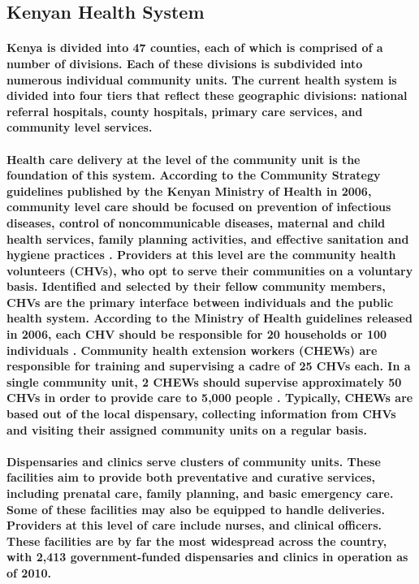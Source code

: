 \subsection{Kenyan Health System}
\paragraph{Kenya is divided into 47 counties, each of which is comprised of a number of divisions. Each of these divisions is subdivided into numerous individual community units. The current health system is divided into four tiers that reflect these geographic divisions: national referral hospitals, county hospitals, primary care services, and community level services. \citep{SPA2010}}

\paragraph{Health care delivery at the level of the community unit is the foundation of this system. According to the Community Strategy guidelines published by the Kenyan Ministry of Health in 2006, community level care should be focused on prevention of infectious diseases, control of noncommunicable diseases, maternal and child health services, family planning activities, and effective sanitation and hygiene practices \citep{CommunityStrategy2006}. Providers at this level are the community  health volunteers (CHVs), who opt to serve their communities on a voluntary basis. Identified and selected by their fellow community members, CHVs are the primary interface between individuals and the public health system. According to the Ministry of Health guidelines released in 2006, each CHV should be responsible for 20 households or 100 individuals \citep{CommunityStrategy2006}. Community health extension workers (CHEWs) are responsible for training and supervising a cadre of 25 CHVs each. In a single community unit, 2 CHEWs should supervise approximately 50 CHVs in order to provide care to 5,000 people \citep{CommunityStrategy2006}. Typically, CHEWs are based out of the local dispensary, collecting information from CHVs and visiting their assigned community units on a regular basis.}

\paragraph{Dispensaries and clinics serve clusters of community units. These facilities aim to provide both preventative and curative services, including prenatal care, family planning, and basic emergency care. Some of these facilities may also be equipped to handle deliveries. Providers at this level of care include nurses, and clinical officers.  These facilities are by far the most widespread across the country, with 2,413 government-funded dispensaries and clinics in operation as of 2010. \citep{SPA2010}}

